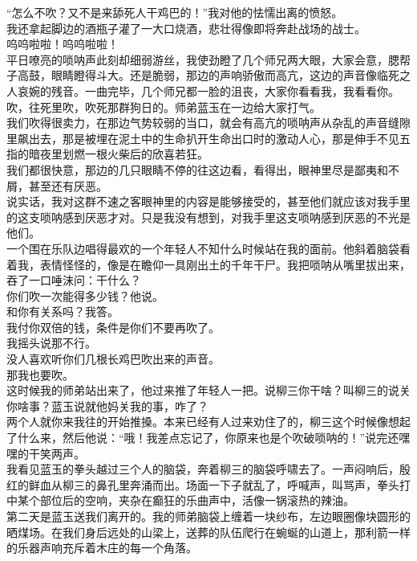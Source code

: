 “怎么不吹？又不是来舔死人干鸡巴的！”我对他的怯懦出离的愤怒。\\

我还拿起脚边的酒瓶子灌了一大口烧酒，悲壮得像即将奔赴战场的战士。\\

呜呜啦啦！呜呜啦啦！\\

平日嘹亮的唢呐声此刻却细弱游丝，我使劲瞪了几个师兄两大眼，大家会意，腮帮子高鼓，眼睛瞪得斗大。还是脆弱，那边的声响骄傲而高亢，这边的声音像临死之人哀婉的残音。一曲完毕，几个师兄都一脸的沮丧，大家你看看我，我看看你。\\

吹，往死里吹，吹死那群狗日的。师弟蓝玉在一边给大家打气。\\

我们吹得很卖力，在那边气势较弱的当口，就会有高亢的唢呐声从杂乱的声音缝隙里飙出去，那是被埋在泥土中的生命扒开生命出口时的激动人心，那是伸手不见五指的暗夜里划燃一根火柴后的欣喜若狂。\\

我们都很快意，那边的几只眼睛不停的往这边看，看得出，眼神里尽是鄙夷和不屑，甚至还有厌恶。\\

说实话，我对这群不速之客眼神里的内容是能够接受的，甚至他们就应该对我手里的这支唢呐感到厌恶才对。只是我没有想到，对我手里这支唢呐感到厌恶的不光是他们。\\

一个围在乐队边唱得最欢的一个年轻人不知什么时候站在我的面前。他斜着脑袋看着我，表情怪怪的，像是在瞻仰一具刚出土的千年干尸。我把唢呐从嘴里拔出来，吞了一口唾沫问：干什么？\\

你们吹一次能得多少钱？他说。\\

和你有关系吗？我答。\\

我付你双倍的钱，条件是你们不要再吹了。\\

我摇头说那不行。\\

没人喜欢听你们几根长鸡巴吹出来的声音。\\

那我也要吹。\\

这时候我的师弟站出来了，他过来推了年轻人一把。说柳三你干啥？叫柳三的说关你啥事？蓝玉说就他妈关我的事，咋了？\\

两个人就你来我往的开始推搡。本来已经有人过来劝住了的，柳三这个时候像想起了什么来，然后他说：“哦！我差点忘记了，你原来也是个吹破唢呐的！”说完还嘿嘿的干笑两声。\\

我看见蓝玉的拳头越过三个人的脑袋，奔着柳三的脑袋呼啸去了。一声闷响后，殷红的鲜血从柳三的鼻孔里奔涌而出。场面一下子就乱了，呼喊声，叫骂声，拳头打中某个部位后的空响，夹杂在癫狂的乐曲声中，活像一锅滚热的辣油。\\

第二天是蓝玉送我们离开的。我的师弟脑袋上缠着一块纱布，左边眼圈像块圆形的晒煤场。在我们身后远处的山梁上，送葬的队伍爬行在蜿蜒的山道上，那利箭一样的乐器声响充斥着木庄的每一个角落。\\
